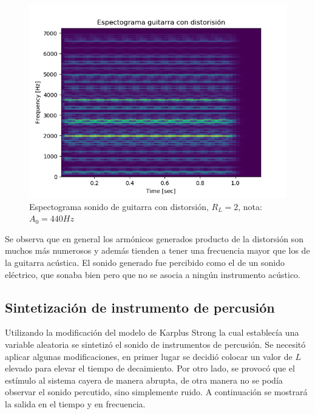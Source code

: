 \documentclass[assd_tp2_main.tex]{subfiles}
\begin{document}
\begin{figure}[H]
	\begin{center}
	\includegraphics[scale=0.5]{graficos/espectograma_guitarra_distorsion.png}
	\caption{Espectograma sonido de guitarra con distorsión, $R_L=2$, nota: $A_0=440 Hz$}

	\end{center}
\end{figure}
Se observa que en general los armónicos generados producto de la distorsión son muchos más numerosos y además tienden a tener una frecuencia mayor que los de la guitarra acústica. 
El sonido generado fue percibido como el de un sonido eléctrico, que sonaba bien pero que no se asocia a ningún instrumento acústico.
 
\subsection{Sintetización de instrumento de percusión}

Utilizando la modificación del modelo de Karplus Strong la cual establec\'ia una variable aleatoria se sintetiz\'o el sonido de instrumentos de percusión. Se necesit\'o aplicar algunas modificaciones, en primer lugar se decidió colocar un valor de $L$ elevado para elevar el tiempo de decaimiento. Por otro lado, se provocó que el est\'imulo al sistema cayera de manera abrupta, de otra manera no se podía observar el sonido percutido, sino simplemente ruido. A continuación se mostrará la salida en el tiempo y en frecuencia.
\end{document}

